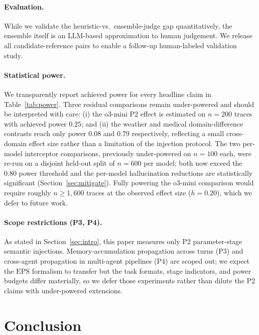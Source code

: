 \documentclass[11pt]{article}
\newcommand{\eps}{\mathrm{EPS}}
\begin{document}
\paragraph{Evaluation.} While we validate the heuristic-vs.\ ensemble-judge gap quantitatively, the ensemble itself is an LLM-based approximation to human judgement. We release all candidate-reference pairs to enable a follow-up human-labeled validation study.

\paragraph{Statistical power.} We transparently report achieved power for every headline claim in Table~\ref{tab:power}. Three residual comparisons remain under-powered and should be interpreted with care: (i) the o3-mini P2 effect is estimated on $n\!=\!200$ traces with achieved power $0.25$; and (ii) the weather and medical domain-difference contrasts reach only power $0.08$ and $0.79$ respectively, reflecting a small cross-domain effect size rather than a limitation of the injection protocol. The two per-model interceptor comparisons, previously under-powered on $n\!=\!100$ each, were re-run on a disjoint held-out split of $n\!=\!600$ per model; both now exceed the $0.80$ power threshold and the per-model hallucination reductions are statistically significant (Section~\ref{sec:mitigate}). Fully powering the o3-mini comparison would require roughly $n\!\geq\!1{,}600$ traces at the observed effect size ($h\!=\!0.20$), which we defer to future work.

\paragraph{Scope restrictions (P3, P4).} As stated in Section~\ref{sec:intro}, this paper measures only P2 parameter-stage semantic injections. Memory-accumulation propagation across turns (P3) and cross-agent propagation in multi-agent pipelines (P4) are scoped out; we expect the $\eps$ formalism to transfer but the task formats, stage indicators, and power budgets differ materially, so we defer those experiments rather than dilute the P2 claims with under-powered extensions.

\section{Conclusion}
\end{document}
